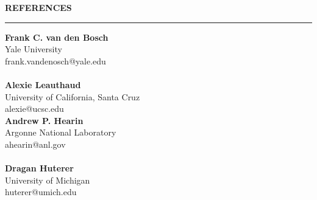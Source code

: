 \documentclass[12pt]{article}
\renewenvironment{section}[1]
  {
  \medskip
  {\color{aublue} \MakeUppercase{\bf #1}}
  \smallskip
  \hrule
  \medskip
  \begin{adjustwidth}{0.3cm}{}
  }
  {
  \end{adjustwidth}
  }
\newcommand{\entry}[3]{{\bf #1} \hfill {#2} \\ {#3}}
\begin{document}
\begin{section}{References}
    \begin{multicols*}{2}
    \entry{Frank C. van den Bosch}{}{Yale University\\frank.vandenosch@yale.edu} \\ \\
    \entry{Alexie Leauthaud}{}{University of California, Santa Cruz\\alexie@ucsc.edu} \columnbreak \\
    \entry{Andrew P. Hearin}{}{Argonne National Laboratory\\ahearin@anl.gov} \\ \\
    \entry{Dragan Huterer}{}{University of Michigan\\huterer@umich.edu}
    \end{multicols*}
\end{section}
\end{document}
